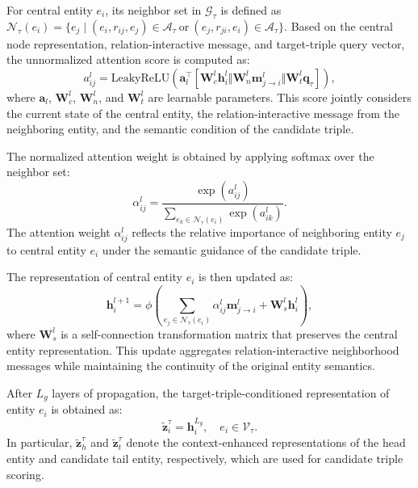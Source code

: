 \documentclass[pdflatex,sn-mathphys-num]{sn-jnl}
\begin{document}
For central entity $e_i$, its neighbor set in $\mathcal{G}_{\tau}$ is defined as
$\mathcal{N}_{\tau}(e_i)=\{e_j\mid(e_i,r_{ij},e_j)\in\mathcal{A}_{\tau}\ \mathrm{or}\ (e_j,r_{ji},e_i)\in\mathcal{A}_{\tau}\}$.
Based on the central node representation, relation-interactive message, and target-triple query vector, the unnormalized attention score is computed as:
\begin{equation}
a_{ij}^{l}
=
\mathrm{LeakyReLU}
\left(
\mathbf{a}_{l}^{\top}
\left[
\mathbf{W}_{c}^{l}\mathbf{h}_{i}^{l}
\Vert
\mathbf{W}_{n}^{l}\mathbf{m}_{j\rightarrow i}^{l}
\Vert
\mathbf{W}_{t}^{l}\mathbf{q}_{\tau}
\right]
\right),
\end{equation}
where $\mathbf{a}_{l}$, $\mathbf{W}_{c}^{l}$, $\mathbf{W}_{n}^{l}$, and $\mathbf{W}_{t}^{l}$ are learnable parameters. This score jointly considers the current state of the central entity, the relation-interactive message from the neighboring entity, and the semantic condition of the candidate triple.

The normalized attention weight is obtained by applying softmax over the neighbor set:
\begin{equation}
\alpha_{ij}^{l}
=
\frac{
\exp(a_{ij}^{l})
}{
\sum_{e_k\in\mathcal{N}_{\tau}(e_i)}
\exp(a_{ik}^{l})
}.
\end{equation}
The attention weight $\alpha_{ij}^{l}$ reflects the relative importance of neighboring entity $e_j$ to central entity $e_i$ under the semantic guidance of the candidate triple.

The representation of central entity $e_i$ is then updated as:
\begin{equation}
\mathbf{h}_{i}^{l+1}
=
\phi
\left(
\sum_{e_j\in\mathcal{N}_{\tau}(e_i)}
\alpha_{ij}^{l}
\mathbf{m}_{j\rightarrow i}^{l}
+
\mathbf{W}_{s}^{l}\mathbf{h}_{i}^{l}
\right),
\end{equation}
where $\mathbf{W}_{s}^{l}$ is a self-connection transformation matrix that preserves the central entity representation. This update aggregates relation-interactive neighborhood messages while maintaining the continuity of the original entity semantics.

After $L_g$ layers of propagation, the target-triple-conditioned representation of entity $e_i$ is obtained as:
\begin{equation}
\widetilde{\mathbf{z}}_{i}^{\tau}
=
\mathbf{h}_{i}^{L_g},
\quad e_i\in\mathcal{V}_{\tau}.
\end{equation}
In particular, $\widetilde{\mathbf{z}}_{h}^{\tau}$ and $\widetilde{\mathbf{z}}_{t}^{\tau}$ denote the context-enhanced representations of the head entity and candidate tail entity, respectively, which are used for candidate triple scoring.
\end{document}
